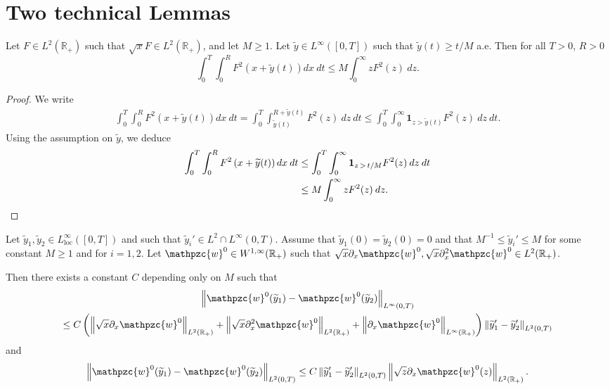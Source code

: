 \documentclass[AHL,Unicode,longabstracts,published]{cedram}
\newcommand{\R}{\mathbb{R}}
\newcommand{\p}{\partial}
\newcommand{\bfun}{\mathbf{1}}
\newcommand{\rloc}{\mathrm{loc}}
\newcommand{\tw}{\mathpzc{w}}
\newcommand{\ty}{\widetilde{y}}
\begin{document}
\section{Two technical Lemmas}
\begin{lemm}\label{lem:x+y}
Let $F\in L^2(\R_+)$ such that $\sqrt{x} F\in L^2(\R_+)$, and let $M\geq 1$. Let $\ty\in L^\infty([0,T])$ such that $\ty(t)\geq t/M$ a.e. Then for all $T>0$, $R>0$
\[
\int_0^T \int_0^R F^2\left(x+\ty(t)\right)dx\:dt\leq M\int_0^\infty z F^2(z)\:dz.
\]
\end{lemm}
\begin{proof}
We write
\begin{multline*}
\int_0^T \int_0^R F^2(x+\ty(t))dx\:dt
=\int_0^T\int_{\ty(t)}^{R+\ty(t)} F^2(z)\:dz\:dt
\leq \int_0^T \int_0^\infty \bfun_{z>\ty(t)} F^2(z)\:dz\: dt.
\end{multline*}
Using the assumption on $\ty$, we deduce
\begin{align*}
\int_0^T \int_0^R F^2\left(x+\ty(t)\right)dx\:dt &\leq \int_0^T \int_0^\infty \bfun_{z\,>\,t/M} F^2(z)\:dz\:dt\\
&\leq M\int_0^\infty z F^2(z)\:dz.\qedhere
\end{align*}
\end{proof}

\begin{lemm}\label{lem:Taylor}
Let $\ty_1, \ty_2\in L^\infty_\rloc([0,T])$ and such that $\ty_i'\in L^2\cap L^\infty(0,T)$. Assume that $\ty_1(0)=\ty_2(0)=0$ and that $M^{-1}\leq \ty_i'\leq M$ for some constant $M\geq 1$ and for $i=1,2$. Let $\tw^0\in W^{1,\infty}(\R_+)$ such that $\sqrt{x}\p_x \tw^0, \sqrt{x}\p_x^2 \tw^0\in L^2(\R_+)$.

Then there exists a constant $C$ depending only on $M$ such that
\begin{multline*}
\left\|\tw^0 (\ty_1)- \tw^0(\ty_2)\right\|_{L^\infty(0,T)}
\\
\leq C\left(\left\| \sqrt{x} \p_x \tw^0\right\|_{L^2(\R_+)} + \left\| \sqrt{x} \p_x^2 \tw^0\right\|_{L^2(\R_+)} + \left\|\p_x \tw^0\right\|_{L^\infty(\R_+)}\right) \left\|\ty_1'-\ty_2'\right\|_{L^2(0,T)}
\end{multline*}
and
\[
\left\|\tw^0 (\ty_1)- \tw^0(\ty_2)\right\|_{L^2(0,T)}\leq C \left\|\ty_1'-\ty_2'\right\|_{L^2(0,T)}\left\| \sqrt{z} \p_x \tw^0(z)\right\|_{L^2(\R_+)}.
\]
\end{lemm}
\end{document}
